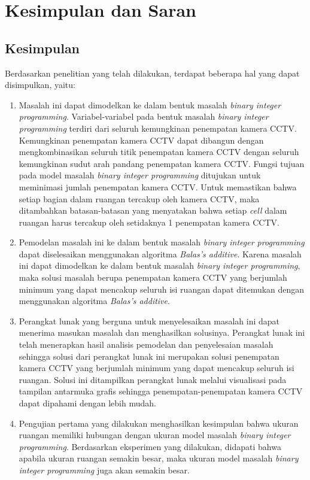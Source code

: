 \chapter{Kesimpulan dan Saran}

\section{Kesimpulan}
Berdasarkan penelitian yang telah dilakukan, terdapat beberapa hal yang dapat disimpulkan, yaitu:
\begin{enumerate}
	\item Masalah ini dapat dimodelkan ke dalam bentuk masalah \textit{binary integer programming}. Variabel-variabel pada bentuk masalah \textit{binary integer programming} terdiri dari seluruh kemungkinan penempatan kamera CCTV. Kemungkinan penempatan kamera CCTV dapat dibangun dengan mengkombinasikan seluruh titik penempatan kamera CCTV dengan seluruh kemungkinan sudut arah pandang penempatan kamera CCTV. Fungsi tujuan pada model masalah \textit{binary integer programming} ditujukan untuk meminimasi jumlah penempatan kamera CCTV. Untuk memastikan bahwa setiap bagian dalam ruangan tercakup oleh kamera CCTV, maka ditambahkan batasan-batasan yang menyatakan bahwa setiap \textit{cell} dalam ruangan harus tercakup oleh setidaknya 1 penempatan kamera CCTV.
	
	\item Pemodelan masalah ini ke dalam bentuk masalah \textit{binary integer programming} dapat diselesaikan menggunakan algoritma \textit{Balas's additive}. Karena masalah ini dapat dimodelkan ke dalam bentuk masalah \textit{binary integer programming}, maka solusi masalah berupa penempatan kamera CCTV yang berjumlah minimum yang dapat mencakup seluruh isi ruangan dapat ditemukan dengan menggunakan algoritma \textit{Balas's additive}.
	
	\item Perangkat lunak yang berguna untuk menyelesaikan masalah ini dapat menerima masukan masalah dan menghasilkan solusinya. Perangkat lunak ini telah menerapkan hasil analisis pemodelan dan penyelesaian masalah sehingga solusi dari perangkat lunak ini merupakan solusi penempatan kamera CCTV yang berjumlah minimum yang dapat mencakup seluruh isi ruangan. Solusi ini ditampilkan perangkat lunak melalui visualisasi pada tampilan antarmuka grafis sehingga penempatan-penempatan kamera CCTV dapat dipahami dengan lebih mudah.
	
	\item Pengujian pertama yang dilakukan menghasilkan kesimpulan bahwa ukuran ruangan memiliki hubungan dengan ukuran model masalah \textit{binary integer programming}. Berdasarkan eksperimen yang dilakukan, didapati bahwa apabila ukuran ruangan semakin besar, maka ukuran model masalah \textit{binary integer programming} juga akan semakin besar.
	

\end{enumerate}
